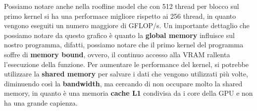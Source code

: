 \documentclass{article}
\begin{document}
  Possiamo notare anche nella roofline model che con 512 thread per blocco sul primo kernel si ha una performace migliore rispetto ai 256 thread, in quanto vengono eseguiti un numero maggiore di 
  GFLOP/s. Un importante dettaglio che possiamo notare da questo grafico è quanto la \textbf{global memory} influisce sul nostro programma, difatti, possiamo notare 
  che il primo kernel del programma soffre di \textbf{memory bound}, ovvero, il continuo accesso alla VRAM rallenta l'esecuzione della funzione. Per aumentare 
  le performance del kernel, si potrebbe utilizzare la \textbf{shared memory} per salvare i dati che vengono utilizzati più volte, diminuendo così la 
  \textbf{bandwidth}, ma cercando di non occupare molto la shared memory, in quanto è una memoria \textbf{cache L1} condivisa da i core della GPU e non ha una grande capienza.
\end{document}
